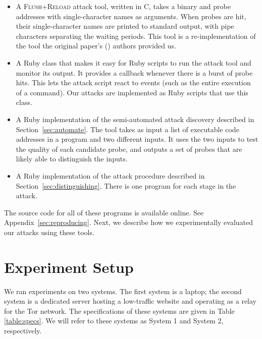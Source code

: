 \documentclass[letterpaper,twocolumn,10pt]{article}
\begin{document}
\begin{itemize}
    \item A \textsc{Flush+Reload} attack tool, written in C, takes a binary and probe
        addresses with single-character names as arguments. When probes are hit,
        their single-character names are printed to standard output, with pipe
        characters separating the waiting periods. This tool is
        a re-implementation of the tool the original paper's
        (\cite{yarom2013flush}) authors provided us.

    \item A Ruby class that makes it easy for Ruby scripts to run the attack
        tool and monitor its output. It provides a callback whenever there is
        a burst of probe hits. This lets the attack script react to events (such
        as the entire execution of a command). Our attacks are implemented as
        Ruby scripts that use this class.

    \item A Ruby implementation of the semi-automated attack discovery described
        in Section~\ref{sec:automate}. The tool takes as input a list of
        executable code addresses in a program and two different inputs. It uses
        the two inputs to test the quality of each candidate probe, and outputs
        a set of probes that are likely able to distinguish the inputs.

    \item A Ruby implementation of the attack procedure described in
          Section~\ref{sec:distinguishing}. There is one program for each stage
          in the attack.
\end{itemize}

The source code for all of these programs is available online. See
Appendix~\ref{sec:reproducing}. Next, we describe how we experimentally
evaluated our attacks using these tools.

\section{Experiment Setup}
\label{sec:experimentsetup}

We ran experiments on two systems. The first system is a laptop; the second
system is a dedicated server hosting a low-traffic website and operating as
a relay for the Tor network. The specifications of these systems are given in
Table \ref{table:specs}. We will refer to these systems as System 1 and System
2, respectively.
\end{document}
